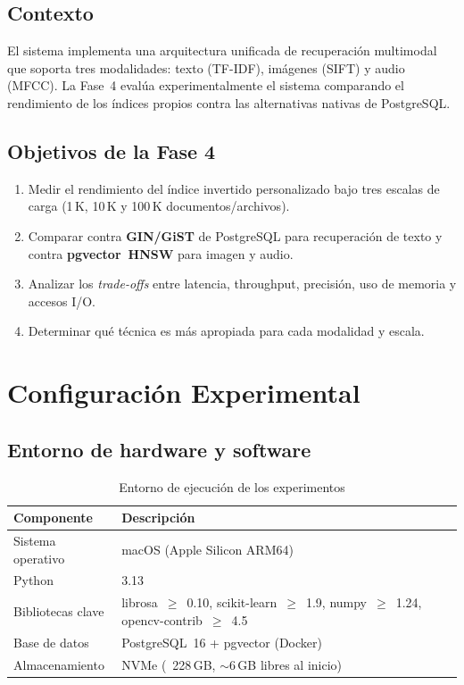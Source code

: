 \documentclass[12pt,a4paper]{article}
\begin{document}
\subsection{Contexto}

El sistema implementa una arquitectura unificada de recuperación multimodal
que soporta tres modalidades: texto (TF-IDF), imágenes (SIFT) y audio (MFCC).
La Fase~4 evalúa experimentalmente el sistema comparando el rendimiento de los
índices propios contra las alternativas nativas de PostgreSQL.

\subsection{Objetivos de la Fase 4}

\begin{enumerate}[leftmargin=*, label=\arabic*.]
  \item Medir el rendimiento del índice invertido personalizado bajo tres
        escalas de carga (1\,K, 10\,K y 100\,K documentos/archivos).
  \item Comparar contra \textbf{GIN/GiST} de PostgreSQL para recuperación
        de texto y contra \textbf{pgvector~HNSW} para imagen y audio.
  \item Analizar los \emph{trade-offs} entre latencia, throughput, precisión,
        uso de memoria y accesos I/O.
  \item Determinar qué técnica es más apropiada para cada modalidad y escala.
\end{enumerate}

\section{Configuración Experimental}

\subsection{Entorno de hardware y software}

\begin{table}[H]
  \centering
  \caption{Entorno de ejecución de los experimentos}
  \begin{tabular}{ll}
    \toprule
    \textbf{Componente} & \textbf{Descripción} \\
    \midrule
    Sistema operativo   & macOS (Apple Silicon ARM64) \\
    Python              & 3.13 \\
    Bibliotecas clave   & librosa~$\geq$~0.10, scikit-learn~$\geq$~1.9,
                          numpy~$\geq$~1.24, opencv-contrib~$\geq$~4.5 \\
    Base de datos       & PostgreSQL~16 + pgvector (Docker) \\
    Almacenamiento      & NVMe (~228\,GB, $\sim$6\,GB libres al inicio) \\
    \bottomrule
  \end{tabular}
\end{table}
\end{document}
